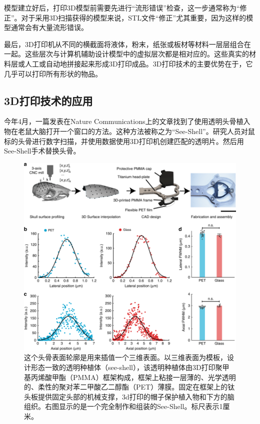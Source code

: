 \documentclass[UTF8,9pt]{ctexart}
\newcommand\sub{\subsection}                                           %
\begin{document}
模型建立好后，打印3D模型前需要先进行“流形错误”检查，这一步通常称为“修正”。对于采用3D扫描获得的模型来说，STL文件“修正”尤其重要，因为这样的模型通常会有大量流形错误。

最后，3D打印机从不同的横截面将液体，粉末，纸张或板材等材料一层层组合在一起。这些层次与计算机辅助设计模型中的虚拟层次都是相对应的。这些真实的材料层或人工或自动地拼接起来形成3D打印成品。3D打印技术的主要优势在于，它几乎可以打印所有形状的物品。
\sub{3D打印技术的应用}
今年4月，一篇发表在Nature Communications上的文章找到了使用透明头骨植入物在老鼠大脑打开一个窗口的方法。这种方法被称之为“See-Shell”。研究人员对鼠标的头骨进行数字扫描，并使用数据使用3D打印机创建匹配的透明片。然后用See-Shell手术替换头骨。

\begin{figure}[htbp]
    \centering
    \includegraphics[scale=0.35]{19.png}
    \caption{这个头骨表面轮廓是用来插值一个三维表面。以三维表面为模板，设计形态一致的透明种植体（see-shell），该透明种植体由3D打印聚甲基丙烯酸甲酯（PMMA）框架构成，框架上粘接一层薄的、光学透明的、柔性的聚对苯二甲酸乙二醇酯（PET）薄膜。固定在框架上的钛头板提供固定头部的机械支撑，3d打印的帽子保护植入物和下方的脑组织。右图显示的是一个完全制作和组装的See-Shell。标尺表示1厘米。}
\end{figure}
\end{document}
